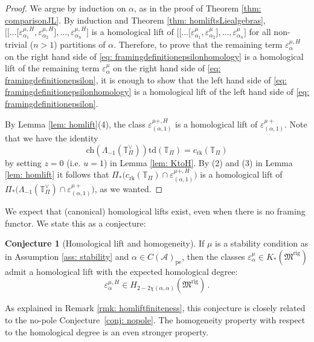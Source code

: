 \documentclass[12pt]{amsart}
\theoremstyle{definition}
\newtheorem{conjecture}[definition]{Conjecture}
\newcommand{\BT}{{\mathbb{T}}}
\newcommand{\CA}{{\mathcal A}}
\newcommand{\1}{\mathbf 1}
\newcommand{\FM}{{\mathfrak{M}}}
\newcommand{\ch}{\mathrm{ch}}
\newcommand{\td}{\mathrm{td}}
\newcommand{\rk}{\mathrm{rk}}
\newcommand{\rig}{\mathrm{rig}}
\newcommand{\pe}{\mathrm{pe}}
\begin{document}
\begin{proof}
    We argue by induction on $\alpha$, as in the proof of Theorem \ref{thm: comparisonJL}. By induction and Theorem \ref{thm: homliftsLiealgebras}, $\big[\big[\ldots\big[\varepsilon_{\alpha_1}^{\mu, H},\varepsilon_{\alpha_2}^{\mu, H}\big],\ldots, \varepsilon_{\alpha_n}^{\mu, H}\big]$ is a homological lift of $\big[\big[\ldots\big[\varepsilon_{\alpha_1}^{\mu},\varepsilon_{\alpha_2}^{\mu}\big],\ldots, \varepsilon_{\alpha_n}^{\mu}\big]$ for all non-trivial ($n>1$) partitions of $\alpha$. Therefore, to prove that the remaining term $\varepsilon_{\alpha}^{\mu, H}$ on the right hand side of \eqref{eq: framingdefinitionepsilonhomology} is a homological lift of the remaining term $\varepsilon_{\alpha}^{\mu}$ on the right hand side of \eqref{eq: framingdefinitionepsilon}, it is enough to show that the left hand side of \eqref{eq: framingdefinitionepsilonhomology} is a homological lift of the left hand side of \eqref{eq: framingdefinitionepsilon}. 

    
    By Lemma \ref{lem: homlift}(4), the class $\varepsilon_{(\alpha, 1)}^{\mu+, H}$ is a homological lift of $\varepsilon_{(\alpha, 1)}^{\mu+}$. Note that we have the identity
    \[\ch(\Lambda_{-1}(\BT_\Pi^\vee))\td(\BT_\Pi)=c_{\rk}(\BT_\Pi)\]
    by setting $z=0$ (i.e. $u=1$) in Lemma \ref{lem: KtoH}. By (2) and (3) in Lemma \ref{lem: homlift} 
    it follows that $\Pi_\ast\big(c_\rk(\BT_\Pi)\cap \varepsilon_{(\alpha, 1)}^{\mu+, H}\big)$ is a homological lift of $\Pi_\ast\big(\Lambda_{-1}(\BT_\Pi^\vee)\cap \varepsilon_{(\alpha, 1)}^{\mu+}\big)$, as we wanted.\qedhere
\end{proof}

We expect that (canonical) homological lifts exist, even when there is no framing functor. We state this as a conjecture:

\begin{conjecture}[Homological lift and homogeneity]\label{conj: homlift}
If $\mu$ is a stability condition as in Assumption \ref{ass: stability} and $\alpha\in C(\CA)_{\pe}$, then the classes $\varepsilon_\alpha^\mu\in K_\ast(\FM^\rig)$ admit a homological lift with the expected homological degree:\[\varepsilon_\alpha^{\mu, H}\in H_{2-2\chi(\alpha, \alpha)}(\FM^\rig)\,.\]
\end{conjecture}

As explained in Remark \ref{rmk: homliftfiniteness}, this conjecture is closely related to the no-pole Conjecture~\ref{conj: nopole}. The homogeneity property with respect to the homological degree is an even stronger property.
\end{document}
